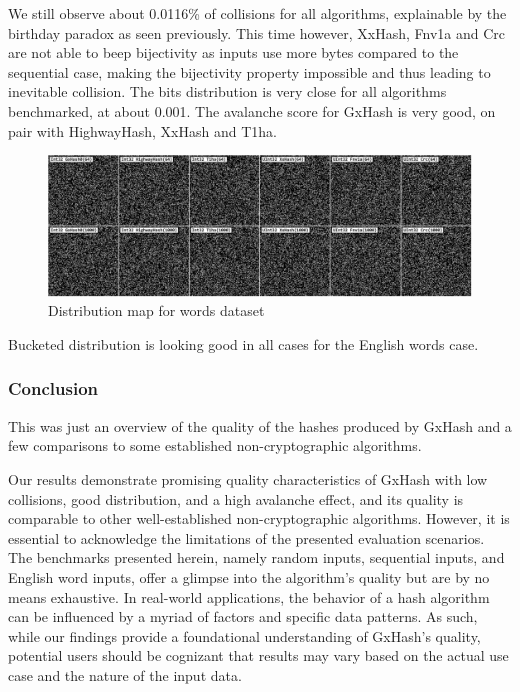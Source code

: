 \documentclass[10pt]{article}
\begin{document}
We still observe about 0.0116\% of collisions for all algorithms, explainable by the birthday paradox as seen previously. This time however, XxHash\cite{xxhash}, Fnv1a and Crc are not able to beep bijectivity as inputs use more bytes compared to the sequential case, making the bijectivity property impossible and thus leading to inevitable collision.
The bits distribution is very close for all algorithms benchmarked, at about 0.001. The avalanche score for GxHash is very good, on pair with HighwayHash\cite{highwayhash}, XxHash\cite{xxhash} and T1ha\cite{rust-t1ha}.

\begin{figure}[H]
\centering
\includegraphics[width=1\textwidth]{quality-markov.png}
\caption{Distribution map for words dataset}
\label{fig:quality-sequential}
\end{figure}

Bucketed distribution is looking good in all cases for the English words case.

\subsubsection{Conclusion}

This was just an overview of the quality of the hashes produced by GxHash and a few comparisons to some established non-cryptographic algorithms. 

Our results demonstrate promising quality characteristics of GxHash with low collisions, good distribution, and a high avalanche effect, and its quality is comparable to other well-established non-cryptographic algorithms. However, it is essential to acknowledge the limitations of the presented evaluation scenarios. The benchmarks presented herein, namely random inputs, sequential inputs, and English word inputs, offer a glimpse into the algorithm's quality but are by no means exhaustive. In real-world applications, the behavior of a hash algorithm can be influenced by a myriad of factors and specific data patterns. As such, while our findings provide a foundational understanding of GxHash's quality, potential users should be cognizant that results may vary based on the actual use case and the nature of the input data.
\end{document}
